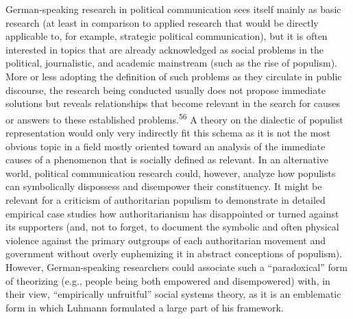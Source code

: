 \documentclass{tufte-handout}
\begin{document}
German-speaking research in political communication sees itself mainly
as basic research (at least in comparison to applied research that would
be directly applicable to, for example, strategic political
communication), but it is often interested in topics that are already
acknowledged as social problems in the political, journalistic, and
academic mainstream (such as the rise of populism). More or less
adopting the definition of such problems as they circulate in public
discourse, the research being conducted usually does not propose
immediate solutions but reveals relationships that become relevant in
the search for causes or answers to these established
problems.\textsuperscript{56} A theory on the dialectic
of populist representation would only very indirectly fit this schema as
it is not the most obvious topic in a field mostly oriented toward an
analysis of the immediate causes of a phenomenon that is socially
defined as relevant. In an alternative world, political communication
research could, however, analyze how populists can symbolically
dispossess and disempower their constituency. It might be relevant for a
criticism of authoritarian populism to demonstrate in detailed empirical
case studies how authoritarianism has disappointed or turned against its
supporters (and, not to forget, to document the symbolic and often
physical violence against the primary outgroups of each authoritarian
movement and government without overly euphemizing it in abstract
conceptions of populism). However, German-speaking researchers could
associate such a ``paradoxical'' form of theorizing (e.g., people being
both empowered and disempowered) with, in their view, ``empirically
unfruitful'' social systems theory, as it is an emblematic form in which
Luhmann formulated a large part of his framework.
\end{document}
